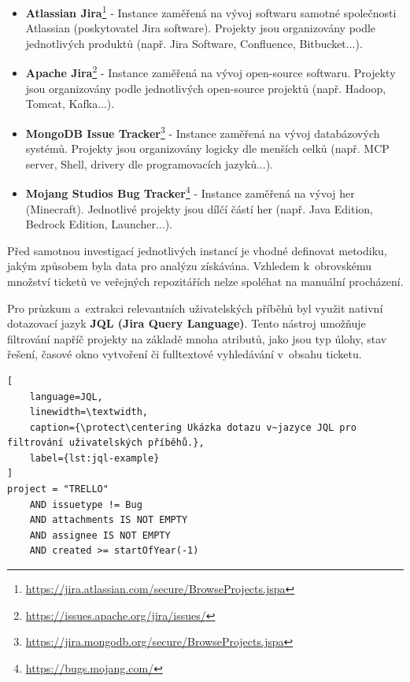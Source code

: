 \documentclass[czech, ing, kiv, he, iso690numb, viewonly]{fasthesis}
\begin{document}
\begin{itemize}
    \item \textbf{Atlassian Jira}\footnote{\url{https://jira.atlassian.com/secure/BrowseProjects.jspa}} - Instance zaměřená na vývoj softwaru samotné společnosti Atlassian (poskytovatel Jira software). Projekty jsou organizovány podle jednotlivých produktů (např. Jira Software, Confluence, Bitbucket...).
    
    \item \textbf{Apache Jira}\footnote{\url{https://issues.apache.org/jira/issues/}} - Instance zaměřená na vývoj open-source softwaru. Projekty jsou organizovány podle jednotlivých open-source projektů (např. Hadoop, Tomcat, Kafka...).
    
    \item \textbf{MongoDB Issue Tracker}\footnote{\url{https://jira.mongodb.org/secure/BrowseProjects.jspa}} - Instance zaměřená na vývoj databázových systémů. Projekty jsou organizovány logicky dle menších celků (např. MCP server, Shell, drivery dle programovacích jazyků...).
    
    \item \textbf{Mojang Studios Bug Tracker}\footnote{\url{https://bugs.mojang.com/}} - Instance zaměřená na vývoj her (Minecraft). Jednotlivé projekty jsou dílčí částí her (např. Java Edition, Bedrock Edition, Launcher...).
\end{itemize}

Před samotnou investigací jednotlivých instancí je vhodné definovat metodiku, jakým způsobem byla data pro analýzu získávána. 
Vzhledem k~obrovskému množství ticketů ve veřejných repozitářích nelze spoléhat na manuální procházení. 

Pro průzkum a~extrakci relevantních uživatelských příběhů byl využit nativní dotazovací jazyk \textbf{JQL (Jira Query Language)}. 
Tento nástroj umožňuje filtrování napříč projekty na základě mnoha atributů, jako jsou typ úlohy, stav řešení, 
časové okno vytvoření či fulltextové vyhledávání v~obsahu ticketu. 

\begin{center}
\begin{minipage}{0.7\textwidth}
\begin{lstlisting}[
    language=JQL, 
    linewidth=\textwidth, 
    caption={\protect\centering Ukázka dotazu v~jazyce JQL pro filtrování uživatelských příběhů.}, 
    label={lst:jql-example}
]
project = "TRELLO" 
    AND issuetype != Bug 
    AND attachments IS NOT EMPTY 
    AND assignee IS NOT EMPTY 
    AND created >= startOfYear(-1)
\end{lstlisting}
\end{minipage}
\end{center}
\end{document}
